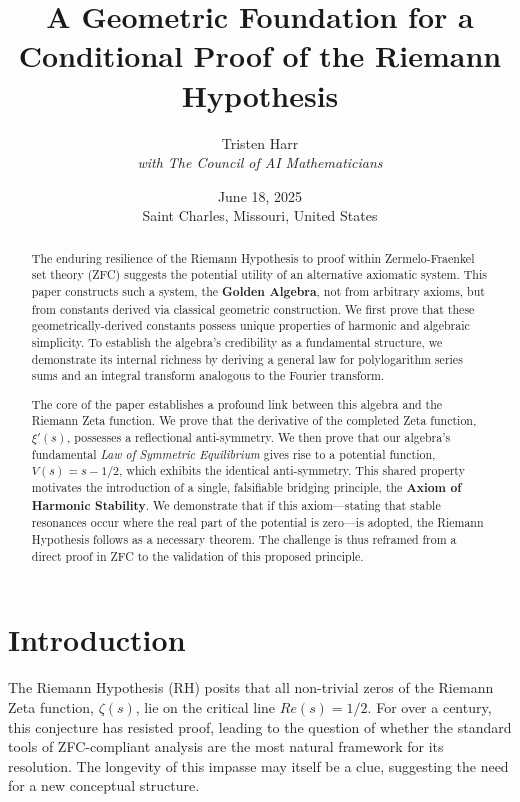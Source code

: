 \documentclass{article}
\title{\textbf{A Geometric Foundation for a Conditional Proof of the Riemann Hypothesis}}
\author{Tristen Harr \\ \textit{with The Council of AI Mathematicians}}
\date{June 18, 2025 \\ Saint Charles, Missouri, United States}
\theoremstyle{plain}
\theoremstyle{definition}
\theoremstyle{remark}
\begin{document}
\maketitle

\begin{abstract}
The enduring resilience of the Riemann Hypothesis to proof within Zermelo-Fraenkel set theory (ZFC) suggests the potential utility of an alternative axiomatic system. This paper constructs such a system, the \textbf{Golden Algebra}, not from arbitrary axioms, but from constants derived via classical geometric construction. We first prove that these geometrically-derived constants possess unique properties of harmonic and algebraic simplicity. To establish the algebra's credibility as a fundamental structure, we demonstrate its internal richness by deriving a general law for polylogarithm series sums and an integral transform analogous to the Fourier transform.

The core of the paper establishes a profound link between this algebra and the Riemann Zeta function. We prove that the derivative of the completed Zeta function, $\xi'(s)$, possesses a reflectional anti-symmetry. We then prove that our algebra's fundamental \textit{Law of Symmetric Equilibrium} gives rise to a potential function, $V(s) = s-1/2$, which exhibits the identical anti-symmetry. This shared property motivates the introduction of a single, falsifiable bridging principle, the \textbf{Axiom of Harmonic Stability}. We demonstrate that if this axiom—stating that stable resonances occur where the real part of the potential is zero—is adopted, the Riemann Hypothesis follows as a necessary theorem. The challenge is thus reframed from a direct proof in ZFC to the validation of this proposed principle.
\end{abstract}

\section{Introduction}
The Riemann Hypothesis (RH) posits that all non-trivial zeros of the Riemann Zeta function, $\zeta(s)$, lie on the critical line $Re(s)=1/2$. For over a century, this conjecture has resisted proof, leading to the question of whether the standard tools of ZFC-compliant analysis are the most natural framework for its resolution. The longevity of this impasse may itself be a clue, suggesting the need for a new conceptual structure.
\end{document}

